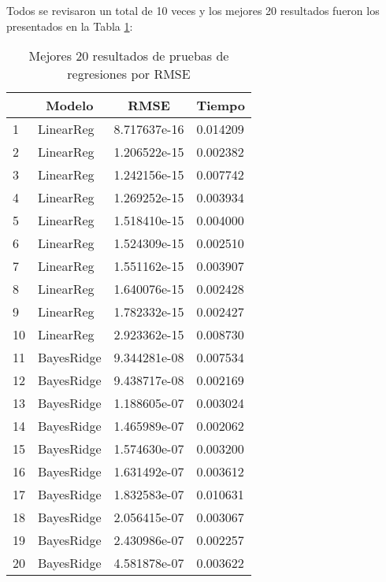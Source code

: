 \documentclass[13.6pt]{article}
\begin{document}
Todos se revisaron un total de 10 veces y los mejores 20 resultados fueron los presentados en la Tabla \ref{table:mejores20}:

\begin{table}[h] \centering
\caption{Mejores 20 resultados de pruebas de regresiones por RMSE}
\label{table:mejores20}
\begin{tabular}{llll}
\hline
\textbf{} & \multicolumn{1}{c}{\textbf{Modelo}} & \multicolumn{1}{c}{\textbf{RMSE}} & \multicolumn{1}{c}{\textbf{Tiempo}} \\ \hline
1         & LinearReg       & 8.717637e-16  & 0.014209        \\
2         & LinearReg       & 1.206522e-15  & 0.002382        \\
3         & LinearReg       & 1.242156e-15  & 0.007742        \\
4         & LinearReg       & 1.269252e-15  & 0.003934        \\
5         & LinearReg       & 1.518410e-15  & 0.004000        \\
6         & LinearReg       & 1.524309e-15  & 0.002510        \\
7         & LinearReg       & 1.551162e-15  & 0.003907        \\
8         & LinearReg       & 1.640076e-15  & 0.002428        \\
9         & LinearReg       & 1.782332e-15  & 0.002427        \\
10        & LinearReg       & 2.923362e-15  & 0.008730        \\
11        & BayesRidge      & 9.344281e-08  & 0.007534        \\
12        & BayesRidge      & 9.438717e-08  & 0.002169        \\
13        & BayesRidge      & 1.188605e-07  & 0.003024        \\
14        & BayesRidge      & 1.465989e-07  & 0.002062        \\
15        & BayesRidge      & 1.574630e-07  & 0.003200        \\
16        & BayesRidge      & 1.631492e-07  & 0.003612        \\
17        & BayesRidge      & 1.832583e-07  & 0.010631        \\
18        & BayesRidge      & 2.056415e-07  & 0.003067        \\
19        & BayesRidge      & 2.430986e-07  & 0.002257        \\
20        & BayesRidge      & 4.581878e-07  & 0.003622        \\ \hline
\end{tabular}
\end{table}


\newpage

\end{document}
